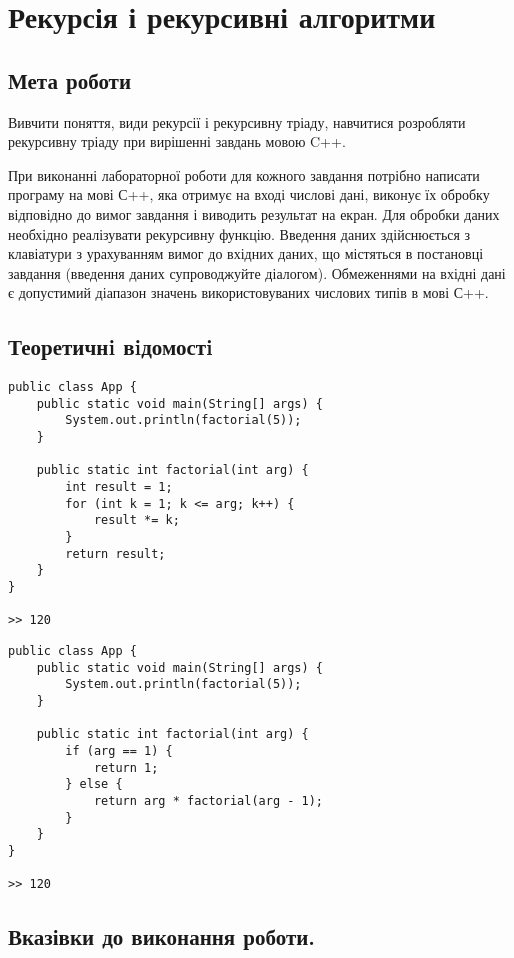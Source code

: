 \chapter{Рекурсія і рекурсивні алгоритми}
\nopagebreak[4]
\section*{Мета роботи}
Вивчити поняття, види рекурсії і рекурсивну тріаду, навчитися розробляти рекурсивну тріаду при вирішенні завдань мовою C++.

При виконанні лабораторної роботи для кожного завдання потрібно написати програму на мові С++, яка отримує на вході числові дані, виконує їх обробку відповідно до вимог завдання і виводить результат на екран. Для обробки даних необхідно реалізувати рекурсивну функцію. Введення даних здійснюється з клавіатури з урахуванням вимог до вхідних даних, що містяться в постановці завдання (введення даних супроводжуйте діалогом). Обмеженнями на вхідні дані є допустимий діапазон значень використовуваних числових типів в мові С++.

\nopagebreak[4]
\section{Теоретичнi вiдомостi}

\begin{lstlisting}[label=code:rec1,caption=Програма обчислення факторіалу ітераційним способом]
public class App {
    public static void main(String[] args) {
        System.out.println(factorial(5));
    }
     
    public static int factorial(int arg) {
        int result = 1;
        for (int k = 1; k <= arg; k++) {
            result *= k;
        }
        return result;
    }
}
 
>> 120
\end{lstlisting}

\begin{lstlisting}[label=code:rec1,caption=Програма обчислення факторіалу рекурсивним способом]
public class App {
    public static void main(String[] args) {
        System.out.println(factorial(5));
    }
     
    public static int factorial(int arg) {
        if (arg == 1) {
            return 1;
        } else {
            return arg * factorial(arg - 1);
        }
    }
}
 
>> 120
\end{lstlisting}
\nopagebreak[4]
\section{Вказівки до виконання роботи.}
\nopagebreak[4]

